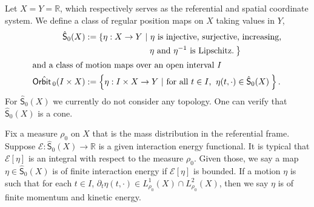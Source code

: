 \documentclass[10pt, letterpaper]{article}
\def\Orb{{\textsf{Orbit}}\,}
\def\E{{\mathcal{E}}}
\theoremstyle{definition}
\theoremstyle{remark}
\begin{document}
Let $X=Y=\mathbb{R}$, which respectively serves as the referential and spatial coordinate system. We define a class of regular position maps on $X$ taking values in $Y$, 
\begin{align*}
 \hat{\textsf{S}}_0(X)&:= \left\{\eta : X \rightarrow Y ~|~ 
\text{$\eta$ is injective, surjective, increasing,} \right.\\
&~~~~~~~~~~~~~~~~~~~~~~\left.\text{$\eta$ and $\eta^{-1}$ is Lipschitz.}\:\right\} \\
\intertext{and a class of motion maps over an open interval $I$}
 \hat{{\Orb}_0}(I\times X)&:= \left\{\eta : I\times X \rightarrow Y ~|~  \text{for all $t \in I$, \:$\eta(t,\cdot) \in \hat{\textsf{S}}_0(X)$} \: \right\}.
\end{align*}
For $\hat{\textsf{S}}_0(X)$ we currently do not consider any topology. One can verify that $\hat{\textsf{S}}_0(X)$ is a cone. 

Fix a measure $\rho_0$ on $X$ that is the mass distribution in the referential frame. %
Suppose $\E : \hat{\textsf{S}}_0(X) \rightarrow \mathbb{R}$ is a given interaction energy functional. It is typical that $\E[\eta]$ is an integral with respect to the measure $\rho_0$. Given those, we say a map $\eta \in \hat{\textsf{S}}_0(X)$ is of finite interaction energy if $\E[\eta]$ is bounded. If a motion $\eta$ is such that for each $t\in I$, $\partial_t \eta(t,\cdot) \in L^1_{\rho_0}(X) \cap L^2_{\rho_0}(X)$, then we say $\eta$ is of finite momentum and kinetic energy. 

\end{document}
